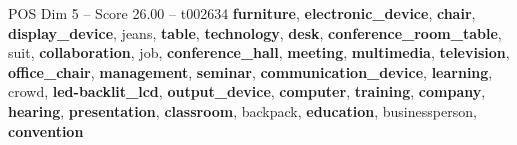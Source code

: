 \begin{textsample}{POS Dim 5 – Score 26.00 – t002634}  \label{ex:f5_pos_036}
\textbf{furniture}, \textbf{electronic\_device}, \textbf{chair}, \textbf{display\_device}, jeans, \textbf{table}, \textbf{technology}, \textbf{desk}, \textbf{conference\_room\_table}, suit, \textbf{collaboration}, job, \textbf{conference\_hall}, \textbf{meeting}, \textbf{multimedia}, \textbf{television}, \textbf{office\_chair}, \textbf{management}, \textbf{seminar}, \textbf{communication\_device}, \textbf{learning}, crowd, \textbf{led-backlit\_lcd}, \textbf{output\_device}, \textbf{computer}, \textbf{training}, \textbf{company}, \textbf{hearing}, \textbf{presentation}, \textbf{classroom}, backpack, \textbf{education}, businessperson, \textbf{convention}

\end{textsample}
